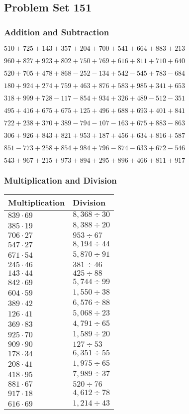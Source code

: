 \hypertarget{problem-set-151}{%
\subsection{Problem Set 151}\label{problem-set-151}}

\hypertarget{addition-and-subtraction}{%
\subsubsection{Addition and
Subtraction}\label{addition-and-subtraction}}

\(510 +725 +143 +357 +204 +700 +541 +664 +883 +213\)

\(960 +827 +923 +802 +750 +769 +616 +811 +710 +640\)

\(520 +705 +478 +868 - 252 - 134 +542 - 545 +783 - 684\)

\(180 +924 +274 +759 +463 +876 +583 +985 +341 +653\)

\(318 +999 +728 - 117 - 854 +934 +326 +489 - 512 - 351\)

\(495 +416 +675 +675 +125 +496 +688 +693 +401 +841\)

\(722 +238 +370 +389 - 794 - 107 - 163 +675 +883 - 863\)

\(306 +926 +843 +821 +953 +187 +456 +634 +816 +587\)

\(851 - 773 +258 +854 +984 +796 - 874 - 633 +672 - 546\)

\(543 +967 +215 +973 +894 +295 +896 +466 +811 +917\)

\hypertarget{multiplication-and-division}{%
\subsubsection{Multiplication and
Division}\label{multiplication-and-division}}

\begin{longtable}[]{@{}ll@{}}
\toprule
Multiplication & Division\tabularnewline
\midrule
\endhead
\(839 \cdot 69\) & \(8,368÷30\)\tabularnewline
\(385 \cdot 19\) & \(8,388÷20\)\tabularnewline
\(706 \cdot 27\) & \(953÷67\)\tabularnewline
\(547 \cdot 27\) & \(8,194÷44\)\tabularnewline
\(671 \cdot 54\) & \(5,870÷91\)\tabularnewline
\(245 \cdot 46\) & \(381÷46\)\tabularnewline
\(143 \cdot 44\) & \(425÷88\)\tabularnewline
\(842 \cdot 69\) & \(5,744÷99\)\tabularnewline
\(604 \cdot 59\) & \(1,550÷38\)\tabularnewline
\(389 \cdot 42\) & \(6,576÷88\)\tabularnewline
\(126 \cdot 41\) & \(5,068÷23\)\tabularnewline
\(369 \cdot 83\) & \(4,791÷65\)\tabularnewline
\(925 \cdot 70\) & \(1,589÷20\)\tabularnewline
\(909 \cdot 90\) & \(127÷53\)\tabularnewline
\(178 \cdot 34\) & \(6,351÷55\)\tabularnewline
\(208 \cdot 41\) & \(1,975÷65\)\tabularnewline
\(418 \cdot 95\) & \(7,989÷37\)\tabularnewline
\(881 \cdot 67\) & \(520÷76\)\tabularnewline
\(917 \cdot 18\) & \(4,612÷78\)\tabularnewline
\(616 \cdot 69\) & \(1,214÷43\)\tabularnewline
\bottomrule
\end{longtable}
